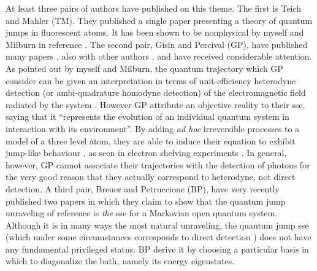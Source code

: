 \documentclass[12pt]{article}
\begin{document}
At least three pairs of authors have published on this theme. The first is Teich and
Mahler (TM). They published a single paper \cite{TeiMah92} presenting a theory of
quantum jumps in fluorescent atoms. It has been shown to be nonphysical by
myself and Milburn in reference \cite{WisMil93c}. The second pair, Gisin  and
Percival (GP), have published many papers \cite{GisPer92a,GisPer92b,GisPer93}, also
with other authors \cite{Gis93}, and have received considerable attention.
As pointed out by myself and Milburn,
the quantum trajectory which GP consider can be given an interpretation
in terms of unit-efficiency heterodyne detection (or ambi-quadrature homodyne
detection) of the electromagnetic field radiated by the system \cite{WisMil93c}.
However GP  attribute an objective reality to their {\sc sse}, saying that
it ``represents the evolution 
of an individual quantum system in interaction with its environment''. 
By adding {\em ad hoc} irreversible processes to a model of a three 
level atom, they are able to induce their equation to exhibit  
jump-like behaviour \cite{Gis93}, as seen in electron shelving 
experiments \cite{Coo88}. In general, 
however, GP cannot associate their trajectories with the detection of  
photons for the very good reason that they actually correspond to heterodyne, 
not direct detection. A third pair, Breuer and Petruccione (BP), have very recently 
published two papers  \cite{BrePet95a,BrePet95b} in which they claim to show that the
quantum jump  unraveling of reference \cite{GarParZol92} is {\em the} {\sc sse} for
a Markovian open quantum system. Although it is in many ways the most natural 
unraveling, the quantum jump {\sc sse} (which under some circumstances corresponds
to direct detection \cite{GarParZol92,WisMil93c}) does not have any fundamental
privileged status. BP derive it by choosing a particular basis in which to
diagonalize the bath, namely its energy eigenstates.
\end{document}

